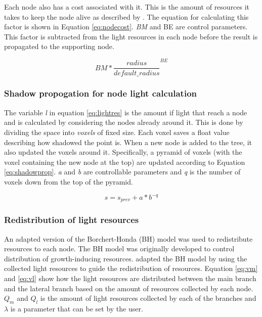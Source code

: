\documentclass{article}
\begin{document}
  				Each node also has a cost associated with it. This is the amount of resources it takes to keep the node alive as described by \cite{mvech1996visual}. The equation for calculating this factor is shown in Equation \ref{eq:nodecost}. \textit{BM} and BE are control parameters. This factor is subtracted from the light resources in each node before the result is propagated to the supporting node. 
  				
  				\begin{equation}
  					\label{eq:nodecost}
  					BM * {\frac{radius}{default\_radius}}^{BE}
  				\end{equation}
  				
  			\subsubsection*{Shadow propogation for node light calculation}
  				
  				The variable \textit{l} in equation \ref{eq:lightres} is the amount if light that reach a node and is calculated by considering the nodes already around it. This is done by dividing the space into \textit{voxels} of fixed size. Each voxel saves a float value describing how shadowed the point is. When a new node is added to the tree, it also updated the voxels around it. Specifically, a pyramid of voxels (with the voxel containing the new node at the top) are updated according to Equation \ref{eq:shadowprop}. \textit{a} and \textit{b} are controllable parameters and \textit{q} is the number of voxels down from the top of the pyramid. \citep{palubicki2009self}
  				
  				\begin{equation}
  					\label{eq:shadowprop}
  					s = s_{prev} + a*b^{-q}
  				\end{equation}
  			
  			\subsubsection*{Redistribution of light resources}
  				An adapted version of the Borchert-Honda (BH) model \citep{borchert1984control} was used to redistribute resources to each node. The BH model was originally developed to control distribution of growth-inducing resources. \cite{palubicki2009self} adapted the BH model by using the collected light resources to guide the redistribution of resources. Equation \ref{eq:vm} and \ref{eq:vl} show how the light resources are distributed between the main branch and the lateral branch  based on the amount of resources collected by each node. $Q_m$ and $Q_l$ is the amount of light resources collected by each of the branches and $\lambda$ is a parameter that can be set by the user.
  			
\end{document}
